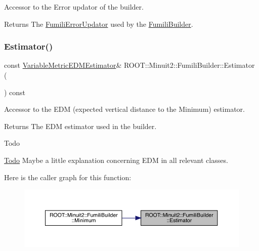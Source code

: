 Accessor to the Error updator of the builder.

\begin{DoxyReturn}{Returns}
The \mbox{\hyperlink{classROOT_1_1Minuit2_1_1FumiliErrorUpdator}{Fumili\+Error\+Updator}} used by the \mbox{\hyperlink{classROOT_1_1Minuit2_1_1FumiliBuilder}{Fumili\+Builder}}. 
\end{DoxyReturn}
\mbox{\label{classROOT_1_1Minuit2_1_1FumiliBuilder_a1e7bd763cd6677dd08d528079143d7b2}} 
\subsubsection{\texorpdfstring{Estimator()}{Estimator()}\hspace{0.1cm}{\footnotesize\ttfamily [1/2]}}
{\footnotesize\ttfamily const \mbox{\hyperlink{classROOT_1_1Minuit2_1_1VariableMetricEDMEstimator}{Variable\+Metric\+E\+D\+M\+Estimator}}\& R\+O\+O\+T\+::\+Minuit2\+::\+Fumili\+Builder\+::\+Estimator (\begin{DoxyParamCaption}{ }\end{DoxyParamCaption}) const\hspace{0.3cm}{\ttfamily [inline]}}

Accessor to the E\+DM (expected vertical distance to the Minimum) estimator.

\begin{DoxyReturn}{Returns}
The E\+DM estimator used in the builder.
\end{DoxyReturn}
\begin{DoxyRefDesc}{Todo}
\item[\mbox{\hyperlink{todo__todo000005}{Todo}}]Maybe a little explanation concerning E\+DM in all relevant classes.\end{DoxyRefDesc}
Here is the caller graph for this function\+:\nopagebreak
\begin{figure}[H]
\begin{center}
\leavevmode
\includegraphics[width=350pt]{dc/dcb/classROOT_1_1Minuit2_1_1FumiliBuilder_a1e7bd763cd6677dd08d528079143d7b2_icgraph}
\end{center}
\end{figure}
\mbox{\label{classROOT_1_1Minuit2_1_1FumiliBuilder_a1e7bd763cd6677dd08d528079143d7b2}} 
